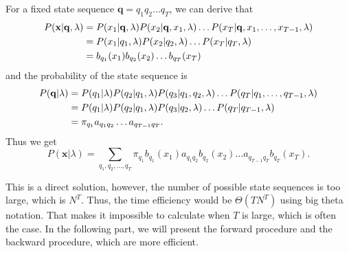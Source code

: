 \documentclass[12pt,final,twoside]{report}
\begin{document}
For a fixed state sequence $\mathbf{q} = q_1 q_2 \dots q_T$, we can derive that
\begin{align}
  P(\mathbf{x}|\mathbf{q},\lambda) &= P(x_1|\mathbf{q},\lambda) P(x_2|\mathbf{q},x_1,\lambda) \dots P(x_T|\mathbf{q},x_1,\dots,x_{T-1},\lambda) \notag\\
  &= P(x_1|q_1, \lambda) P(x_2|q_2, \lambda) \dots P(x_T|q_T, \lambda) \notag\\
  &= b_{q_1}(x_1) b_{q_2}(x_2) \dots b_{q_T}(x_T)
\end{align}
and the probability of the state sequence is
\begin{align}
  P(\mathbf{q}|\lambda) &= P(q_1|\lambda) P(q_2|q_1,\lambda) P(q_3|q_1,q_2,\lambda) \dots P(q_T|q_1,\dots,q_{T-1},\lambda) \notag\\
  &= P(q_1|\lambda) P(q_2|q_1,\lambda) P(q_3|q_2,\lambda) \dots P(q_T|q_{T-1},\lambda)  \notag\\
  &= \pi_{q_1} a_{q_1q_2} \dots a_{q_{T-1}q_T} .
\end{align}
Thus we get 
\begin{equation}
  P(\mathbf{x}|\lambda) = \sum_{q_1,q_2,\dots,q_T} \pi_{q_1} b_{q_1}(x_1) a_{q_1q_2} b_{q_2}(x_2) \dots a_{q_{T-1}q_T} b_{q_T}(x_T) .
  \label{eq:prob_brute}
\end{equation}

This is a direct solution, however, the number of possible state sequences is too large, which is $N^T$. Thus, the time efficiency would be $\Theta(T N^T)$ using big theta notation. That makes it impossible to calculate when $T$ is large, which is often the case. In the following part, we will present the forward procedure and the backward procedure, which are more efficient.
\end{document}
